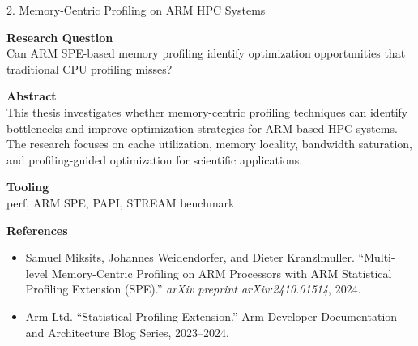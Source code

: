 \documentclass[aspectratio=169]{beamer}
\begin{document}
\begin{frame}{2. Memory-Centric Profiling on ARM HPC Systems}
\small

\textbf{Research Question}\\
Can ARM SPE-based memory profiling identify optimization opportunities that traditional CPU profiling misses?

\vspace{0.35em}

\textbf{Abstract}\\
This thesis investigates whether memory-centric profiling techniques can identify bottlenecks and improve optimization strategies for ARM-based HPC systems. The research focuses on cache utilization, memory locality, bandwidth saturation, and profiling-guided optimization for scientific applications.

\vspace{0.35em}

\textbf{Tooling}\\
perf, ARM SPE, PAPI, STREAM benchmark

\vspace{0.35em}

\textbf{References}
\begin{itemize}
\item Samuel Miksits, Johannes Weidendorfer, and Dieter Kranzlmuller. ``Multi-level Memory-Centric Profiling on ARM Processors with ARM Statistical Profiling Extension (SPE).'' \emph{arXiv preprint arXiv:2410.01514}, 2024.

\item Arm Ltd. ``Statistical Profiling Extension.'' Arm Developer Documentation and Architecture Blog Series, 2023--2024.
\end{itemize}

\end{frame}

\end{document}
